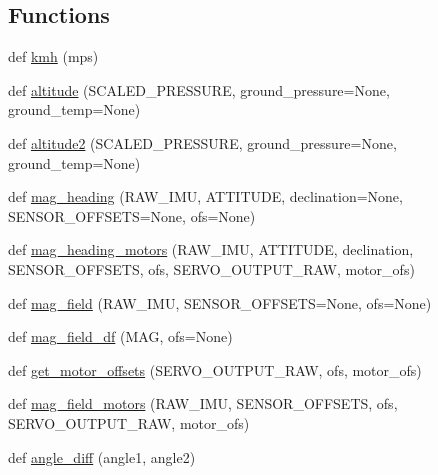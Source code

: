 \subsection*{Functions}
\begin{DoxyCompactItemize}
\item 
def \mbox{\hyperlink{namespacepymavlink_1_1mavextra_a763fb9e3242f5ec9ec1fec177c4e50ae}{kmh}} (mps)
\item 
def \mbox{\hyperlink{namespacepymavlink_1_1mavextra_abb4bb839562172e4585d794e68856b14}{altitude}} (S\+C\+A\+L\+E\+D\+\_\+\+P\+R\+E\+S\+S\+U\+RE, ground\+\_\+pressure=None, ground\+\_\+temp=None)
\item 
def \mbox{\hyperlink{namespacepymavlink_1_1mavextra_af5dcda30d85d910c246199de4189750f}{altitude2}} (S\+C\+A\+L\+E\+D\+\_\+\+P\+R\+E\+S\+S\+U\+RE, ground\+\_\+pressure=None, ground\+\_\+temp=None)
\item 
def \mbox{\hyperlink{namespacepymavlink_1_1mavextra_aa27cdc29ee82e3515eace9a8a98c331b}{mag\+\_\+heading}} (R\+A\+W\+\_\+\+I\+MU, A\+T\+T\+I\+T\+U\+DE, declination=None, S\+E\+N\+S\+O\+R\+\_\+\+O\+F\+F\+S\+E\+TS=None, ofs=None)
\item 
def \mbox{\hyperlink{namespacepymavlink_1_1mavextra_aed3e1ad61d9f219e180e9e3ac94764fe}{mag\+\_\+heading\+\_\+motors}} (R\+A\+W\+\_\+\+I\+MU, A\+T\+T\+I\+T\+U\+DE, declination, S\+E\+N\+S\+O\+R\+\_\+\+O\+F\+F\+S\+E\+TS, ofs, S\+E\+R\+V\+O\+\_\+\+O\+U\+T\+P\+U\+T\+\_\+\+R\+AW, motor\+\_\+ofs)
\item 
def \mbox{\hyperlink{namespacepymavlink_1_1mavextra_ae2c6b9c7ca47d69bc730cfc544c41b62}{mag\+\_\+field}} (R\+A\+W\+\_\+\+I\+MU, S\+E\+N\+S\+O\+R\+\_\+\+O\+F\+F\+S\+E\+TS=None, ofs=None)
\item 
def \mbox{\hyperlink{namespacepymavlink_1_1mavextra_a4bdc6d85f92efa62d773a8609aabaa32}{mag\+\_\+field\+\_\+df}} (M\+AG, ofs=None)
\item 
def \mbox{\hyperlink{namespacepymavlink_1_1mavextra_a5c02a6aebf8c43eef46c2aad3b75623a}{get\+\_\+motor\+\_\+offsets}} (S\+E\+R\+V\+O\+\_\+\+O\+U\+T\+P\+U\+T\+\_\+\+R\+AW, ofs, motor\+\_\+ofs)
\item 
def \mbox{\hyperlink{namespacepymavlink_1_1mavextra_afd8e63b1dd36777b854b99782f284831}{mag\+\_\+field\+\_\+motors}} (R\+A\+W\+\_\+\+I\+MU, S\+E\+N\+S\+O\+R\+\_\+\+O\+F\+F\+S\+E\+TS, ofs, S\+E\+R\+V\+O\+\_\+\+O\+U\+T\+P\+U\+T\+\_\+\+R\+AW, motor\+\_\+ofs)
\item 
def \mbox{\hyperlink{namespacepymavlink_1_1mavextra_a4c518cade632dd29062b09b919c4f9e1}{angle\+\_\+diff}} (angle1, angle2)

\end{DoxyCompactItemize}

